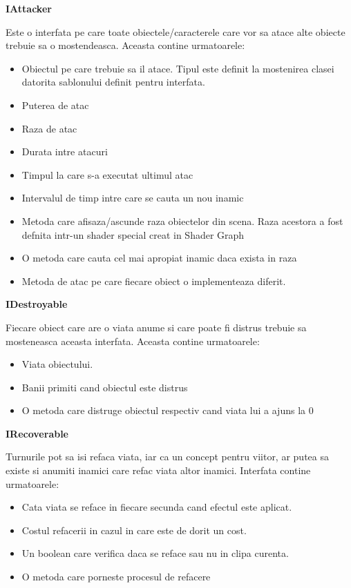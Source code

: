 \documentclass[12pt, a4paper]{article}
\begin{document}
	\textbf{IAttacker}
	
	 Este o interfata pe care toate obiectele/caracterele care vor sa atace alte obiecte trebuie sa o mostendeasca. Aceasta contine urmatoarele:
	 
	 \begin{itemize}
	 	\item Obiectul pe care trebuie sa il atace. Tipul este definit la mostenirea clasei datorita sablonului definit pentru interfata.
	 	\item Puterea de atac
	 	\item Raza de atac
	 	\item Durata intre atacuri
	 	\item Timpul la care s-a executat ultimul atac
	 	\item Intervalul de timp intre care se cauta un nou inamic
	 	\item Metoda care afisaza/ascunde raza obiectelor din scena. Raza acestora a fost defnita intr-un shader special creat in Shader Graph
	 	\item O metoda care cauta cel mai apropiat inamic daca exista in raza
	 	\item Metoda de atac pe care fiecare obiect o implementeaza diferit.
	\end{itemize}
 	\bigskip
 	
 	\textbf{IDestroyable}
 	
 	Fiecare obiect care are o viata anume si care poate fi distrus trebuie sa mosteneasca aceasta interfata. Aceasta contine urmatoarele:
 	
 	\begin{itemize}
 		\item Viata obiectului.
 		\item Banii primiti cand obiectul este distrus
 		\item O metoda care distruge obiectul respectiv cand viata lui a ajuns la 0
 	\end{itemize}
 	\bigskip
 	
 	\textbf{IRecoverable}
 	
 	Turnurile pot sa isi refaca viata, iar ca un concept pentru viitor, ar putea sa existe si anumiti inamici care refac viata altor inamici. Interfata contine urmatoarele:
 	
 	\begin{itemize}
 		\item Cata viata se reface in fiecare secunda cand efectul este aplicat.
 		\item Costul refacerii in cazul in care este de dorit un cost.
 		\item Un boolean care verifica daca se reface sau nu in clipa curenta.
 		\item O metoda care porneste procesul de refacere
 	\end{itemize}
	
\end{document}
